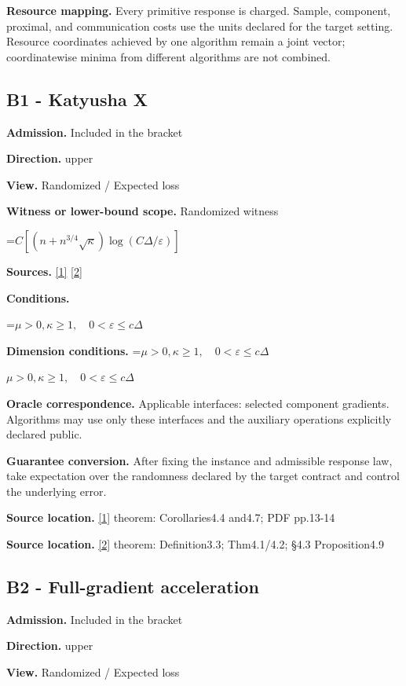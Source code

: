 \documentclass[10pt,a4paper]{article}
\newcommand{\AtlasMath}[1]{\par\begingroup\centering\setbox0=\hbox{$\displaystyle #1$}\ifdim\wd0>1.4\linewidth\typeout{ATLAS WIDE FORMULA: \the\wd0}\fi\ifdim\wd0>\linewidth\resizebox{\linewidth}{!}{\box0}\else\box0\fi\par\endgroup}
\newcommand{\AtlasInlineMath}[1]{\begingroup\setbox0=\hbox{$#1$}\ifdim\wd0>.4\linewidth\endgroup\AtlasMath{#1}\else\endgroup$#1$\fi}
\begin{document}
\textbf{Resource mapping.} Every primitive response is charged. Sample, component, proximal, and communication costs use the units declared for the target setting. Resource coordinates achieved by one algorithm remain a joint vector; coordinatewise minima from different algorithms are not combined.

\subsection{B1 - Katyusha X}
\textbf{Admission.} Included in the bracket

\textbf{Direction.} upper

\textbf{View.} Randomized / Expected loss

\textbf{Witness or lower-bound scope.} Randomized witness

\AtlasMath{C[(n+n^{3/4}\sqrt\kappa)\log(C\Delta/\varepsilon)]}
\textbf{Sources.} \href{https://arxiv.org/pdf/1802.03866}{[1]} \href{https://proceedings.mlr.press/v97/zhou19b/zhou19b.pdf}{[2]}

\textbf{Conditions.} 
\AtlasMath{\mu>0,\kappa\ge1,\quad0<\varepsilon\le c\Delta}


\textbf{Dimension conditions.} \AtlasInlineMath{\mu>0,\kappa\ge1,\quad0<\varepsilon\le c\Delta}

\textbf{Oracle correspondence.} Applicable interfaces: selected component gradients. Algorithms may use only these interfaces and the auxiliary operations explicitly declared public.

\textbf{Guarantee conversion.} After fixing the instance and admissible response law, take expectation over the randomness declared by the target contract and control the underlying error.

\textbf{Source location.} \href{https://arxiv.org/pdf/1802.03866}{[1]} theorem: Corollaries4.4 and4.7; PDF pp.13-14

\textbf{Source location.} \href{https://proceedings.mlr.press/v97/zhou19b/zhou19b.pdf}{[2]} theorem: Definition3.3; Thm4.1/4.2; §4.3 Proposition4.9

\subsection{B2 - Full-gradient acceleration}
\textbf{Admission.} Included in the bracket

\textbf{Direction.} upper

\textbf{View.} Randomized / Expected loss
\end{document}
